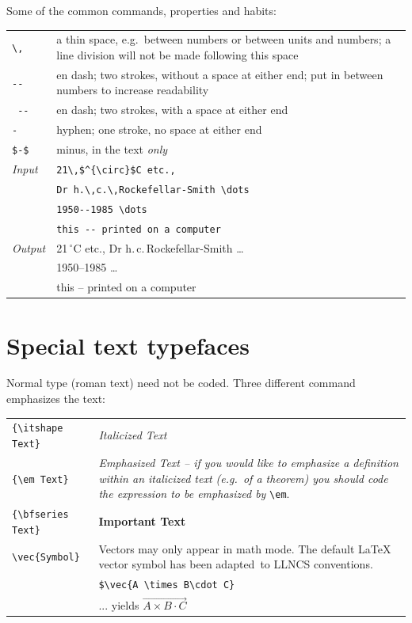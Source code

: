 \documentclass[usenatbib]{tjaa}
\begin{document}
Some of the common commands, properties and habits:
\begin{flushleft}
\begin{tabular}{@{}p{}p{}}
\verb|\,|   & a thin space, e.g.\ between numbers or between units
              and numbers; a line division will not be made
              following this space\\
\verb|--|   & en dash; two strokes, without a space at either end;
	      put in between numbers to increase readability\\
\verb*| -- |& en dash; two strokes, with  a space at either end\\
\verb|-|    & hyphen; one stroke, no space at either end\\
\verb|$-$|  & minus, in the text {\em only} \\
{\em Input} & \verb|21\,$^{\circ}$C etc.,|\\
            & \verb|Dr h.\,c.\,Rockefellar-Smith \dots|\\
            & \verb|1950--1985 \dots|\\
            & \verb|this -- printed on a computer|\\
{\em Output}& 21\,$^{\circ}$C etc., Dr h.\,c.\,Rockefellar-Smith \dots\\
            & 1950--1985 \dots\\
            & this -- printed on a computer
\end{tabular}
\end{flushleft}

\section{Special text typefaces}

Normal type (roman text) need not be coded. Three different command
emphasizes the text:
\begin{flushleft}
\begin{tabular}{@{}p{}p{}}
\verb|{\itshape Text}|   & {\itshape Italicized Text}\\
\verb|{\em Text}|   & {\em Emphasized Text --
   if you would like to emphasize a {\em definition} within an
   italicized text (e.g.\ of a {\em theorem}) you should code the
   expression to be emphasized by} \verb|\em|.\\
\verb|{\bfseries Text}|& {\bfseries Important Text}\\
\verb|\vec{Symbol}| & Vectors may only appear in math mode. The default
   \LaTeX{} vector symbol has been adapted\footnotemark\
   to LLNCS conventions.\\[2pt]
 & \verb|$\vec{A \times B\cdot C}|\\
 & ... yields $\vec{A\times B\cdot C}$
\end{tabular}
\end{flushleft}
\end{document}
